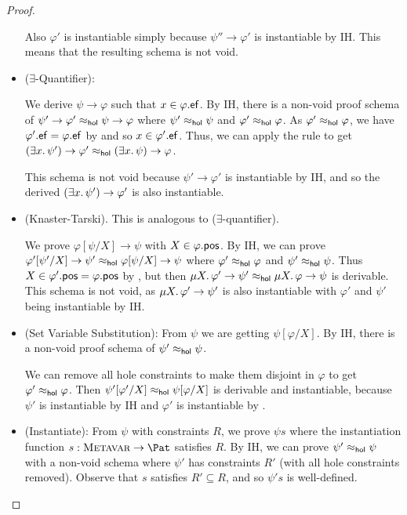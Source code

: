 \documentclass{mgr}
\begin{document}
\begin{theorem*}[WIP]
\begin{proof}
\begin{itemize}
      Also $\varphi'$ is instantiable simply because $\psi'' \to \varphi'$ is instantiable by IH.
      This means that the resulting schema is not void.

      \item ($\exists$-Quantifier):

      We derive $\psi \to \varphi$ such that $x \in \varphi.\mathsf{ef}$.
      By IH, there is a non-void proof schema of $\psi' \to \varphi' \approx_{\mathsf{hol}} \psi \to \varphi$ where  $\psi' \approx_{\mathsf{hol}} \psi$ and $\varphi' \approx_{\mathsf{hol}} \varphi$. As $\varphi' \approx_{\mathsf{hol}} \varphi$, we have $\varphi'.\mathsf{ef} = \varphi.\mathsf{ef}$ by  and so $x \in \varphi'.\mathsf{ef}$.
      Thus, we can apply the rule to get $(\exists x \ldotp \psi') \to \varphi' \approx_{\mathsf{hol}} (\exists x \ldotp \psi) \to \varphi$.

      This schema is not void because $\psi' \to \varphi'$ is instantiable by IH, and so the derived $(\exists x \ldotp \psi') \to \varphi'$ is also instantiable.

      \item (Knaster-Tarski).
      This is analogous to ($\exists$-quantifier).

      We prove $\varphi[\psi/X] \to \psi$ with $X \in \varphi.\mathsf{pos}$.
      By IH, we can prove $\varphi'[\psi'/X] \to \psi' \approx_{\mathsf{hol}} \varphi[\psi/X] \to \psi$ where $\varphi' \approx_{\mathsf{hol}} \varphi$ and $\psi' \approx_{\mathsf{hol}} \psi$.
      Thus $X \in \varphi'.\mathsf{pos} = \varphi.\mathsf{pos}$ by , but then $\mu X \ldotp \varphi' \to \psi' \approx_{\mathsf{hol}} \mu X \ldotp \varphi \to \psi$ is derivable.
      This schema is not void, as $\mu X \ldotp \varphi' \to \psi'$ is also instantiable with $\varphi'$ and $\psi'$ being instantiable by IH.

      \item (Set Variable Substitution):
      From $\psi$ we are getting $\psi[\varphi/X]$.
      By IH, there is a non-void proof schema of $\psi' \approx_{\mathsf{hol}} \psi$.

      We can remove all hole constraints to make them disjoint in $\varphi$ to get $\varphi' \approx_{\mathsf{hol}} \varphi$.
      Then $\psi'[\varphi'/X] \approx_{\mathsf{hol}} \psi[\varphi/X]$ is derivable and instantiable, because $\psi'$ is instantiable by IH and $\varphi'$ is  instantiable by .

      \item (Instantiate): From $\psi$ with constraints $R$, we prove $\psi s$ where the instantiation function $s : \Metavar \to \Pat$ satisfies $R$.
      By IH, we can prove $\psi' \approx_{\mathsf{hol}} \psi$ with a non-void schema where $\psi'$ has constraints $R'$ (with all hole constraints removed).
      Observe that $s$ satisfies $R' \subseteq R$, and so $\psi' s$ is well-defined.


\end{itemize}
\end{proof}
\end{theorem*}
\end{document}
